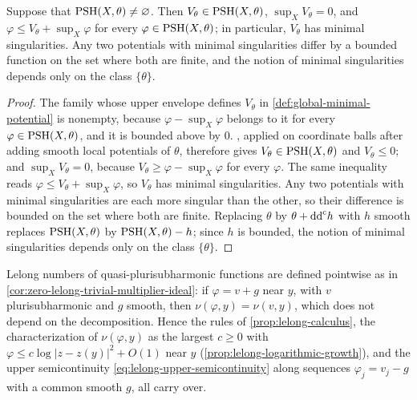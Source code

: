 \begin{lemma}\label{lem:global-minimal-envelope}
Suppose that $\mathrm{PSH}(X,\theta)\neq\varnothing$. Then $V_\theta\in\mathrm{PSH}(X,\theta)$, $\sup_XV_\theta=0$, and $\varphi\leq V_\theta+\sup_X\varphi$ for every $\varphi\in\mathrm{PSH}(X,\theta)$; in particular, $V_\theta$ has minimal singularities. Any two potentials with minimal singularities differ by a bounded function on the set where both are finite, and the notion of minimal singularities depends only on the class $\{\theta\}$.
\end{lemma}
\begin{proof}
The family whose upper envelope defines $V_\theta$ in \cref{def:global-minimal-potential} is nonempty, because $\varphi-\sup_X\varphi$ belongs to it for every $\varphi\in\mathrm{PSH}(X,\theta)$, and it is bounded above by $0$. , applied on coordinate balls after adding smooth local potentials of $\theta$, therefore gives $V_\theta\in\mathrm{PSH}(X,\theta)$ and $V_\theta\leq0$; and $\sup_XV_\theta=0$, because $V_\theta\geq\varphi-\sup_X\varphi$ for every $\varphi$. The same inequality reads $\varphi\leq V_\theta+\sup_X\varphi$, so $V_\theta$ has minimal singularities. Any two potentials with minimal singularities are each more singular than the other, so their difference is bounded on the set where both are finite. Replacing $\theta$ by $\theta+\mathrm{dd}^{\mathrm{c}} h$ with $h$ smooth replaces $\mathrm{PSH}(X,\theta)$ by $\mathrm{PSH}(X,\theta)-h$; since $h$ is bounded, the notion of minimal singularities depends only on the class $\{\theta\}$.
\end{proof}

Lelong numbers of quasi-plurisubharmonic functions are defined pointwise as in \cref{cor:zero-lelong-trivial-multiplier-ideal}: if $\varphi=v+g$ near $y$, with $v$ plurisubharmonic and $g$ smooth, then $\nu(\varphi,y)=\nu(v,y)$, which does not depend on the decomposition. Hence the rules of \cref{prop:lelong-calculus}, the characterization of $\nu(\varphi,y)$ as the largest $c\geq0$ with $\varphi\leq c\log|z-z(y)|^2+O(1)$ near $y$ (\cref{prop:lelong-logarithmic-growth}), and the upper semicontinuity \eqref{eq:lelong-upper-semicontinuity} along sequences $\varphi_j=v_j-g$ with a common smooth $g$, all carry over.

